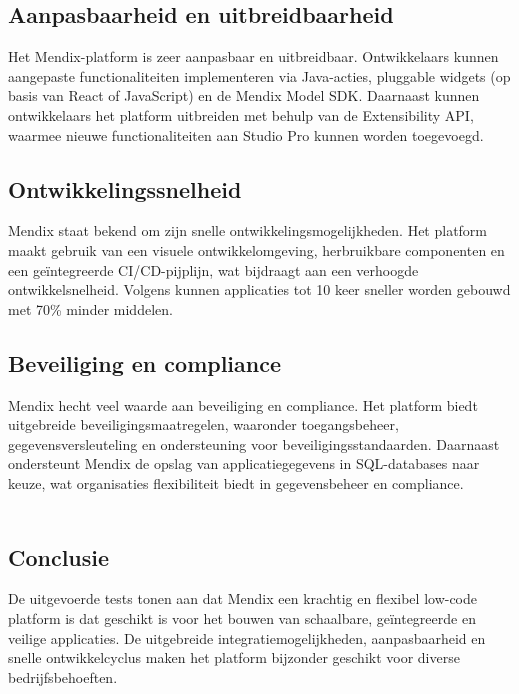 \subsection{Aanpasbaarheid en uitbreidbaarheid}
Het Mendix-platform is zeer aanpasbaar en uitbreidbaar. Ontwikkelaars kunnen aangepaste functionaliteiten implementeren via Java-acties, pluggable widgets (op basis van React of JavaScript) en de Mendix Model SDK. Daarnaast kunnen ontwikkelaars het platform uitbreiden met behulp van de Extensibility API, waarmee nieuwe functionaliteiten aan Studio Pro kunnen worden toegevoegd.

\subsection{Ontwikkelingssnelheid}
Mendix staat bekend om zijn snelle ontwikkelingsmogelijkheden. Het platform maakt gebruik van een visuele ontwikkelomgeving, herbruikbare componenten en een geïntegreerde CI/CD-pijplijn, wat bijdraagt aan een verhoogde ontwikkelsnelheid. Volgens \textcite{MxTechies} kunnen applicaties tot 10 keer sneller worden gebouwd met 70\% minder middelen. 

\subsection{Beveiliging en compliance}
Mendix hecht veel waarde aan beveiliging en compliance. Het platform biedt uitgebreide beveiligingsmaatregelen, waaronder toegangsbeheer, gegevensversleuteling en ondersteuning voor beveiligingsstandaarden. Daarnaast ondersteunt Mendix de opslag van applicatiegegevens in SQL-databases naar keuze, wat organisaties flexibiliteit biedt in gegevensbeheer en compliance. 
\\
\\
\subsection{Conclusie}
De uitgevoerde tests tonen aan dat Mendix een krachtig en flexibel low-code platform is dat geschikt is voor het bouwen van schaalbare, geïntegreerde en veilige applicaties. De uitgebreide integratiemogelijkheden, aanpasbaarheid en snelle ontwikkelcyclus maken het platform bijzonder geschikt voor diverse bedrijfsbehoeften.


